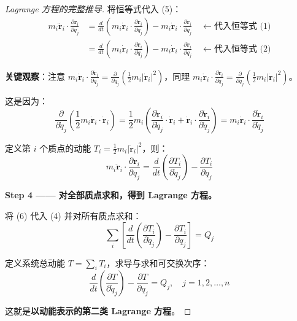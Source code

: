 \begin{proof}[Lagrange 方程的完整推导]
	将恒等式代入 (5)：
	\[
	\begin{aligned}
	m_i \ddot{\mathbf{r}}_i \cdot \frac{\partial \mathbf{r}_i}{\partial q_j} &= \frac{d}{dt} \left( m_i \dot{\mathbf{r}}_i \cdot \frac{\partial \dot{\mathbf{r}}_i}{\partial \dot{q}_j} \right) - m_i \dot{\mathbf{r}}_i \cdot \frac{\partial \dot{\mathbf{r}}_i}{\partial q_j} \quad \leftarrow \text{代入恒等式 (1)} \\
	&= \frac{d}{dt} \left( m_i \dot{\mathbf{r}}_i \cdot \frac{\partial \dot{\mathbf{r}}_i}{\partial \dot{q}_j} \right) - m_i \dot{\mathbf{r}}_i \cdot \frac{\partial \dot{\mathbf{r}}_i}{\partial q_j} \quad \leftarrow \text{代入恒等式 (2)}
	\end{aligned}
	\]
	
	\textbf{关键观察}：注意 $m_i \dot{\mathbf{r}}_i \cdot \frac{\partial \dot{\mathbf{r}}_i}{\partial \dot{q}_j} = \frac{\partial}{\partial \dot{q}_j} \left( \frac{1}{2} m_i |\dot{\mathbf{r}}_i|^2 \right)$，同理 $m_i \dot{\mathbf{r}}_i \cdot \frac{\partial \dot{\mathbf{r}}_i}{\partial q_j} = \frac{\partial}{\partial q_j} \left( \frac{1}{2} m_i |\dot{\mathbf{r}}_i|^2 \right)$。
	
	这是因为：
	\[
	\frac{\partial}{\partial \dot{q}_j} \left( \frac{1}{2} m_i \dot{\mathbf{r}}_i \cdot \dot{\mathbf{r}}_i \right) = \frac{1}{2} m_i \left( \frac{\partial \dot{\mathbf{r}}_i}{\partial \dot{q}_j} \cdot \dot{\mathbf{r}}_i + \dot{\mathbf{r}}_i \cdot \frac{\partial \dot{\mathbf{r}}_i}{\partial \dot{q}_j} \right) = m_i \dot{\mathbf{r}}_i \cdot \frac{\partial \dot{\mathbf{r}}_i}{\partial \dot{q}_j}
	\]
	
	定义第 $i$ 个质点的动能 $T_i = \frac{1}{2} m_i |\dot{\mathbf{r}}_i|^2$，则：
	\[
	m_i \ddot{\mathbf{r}}_i \cdot \frac{\partial \mathbf{r}_i}{\partial q_j} = \frac{d}{dt} \left( \frac{\partial T_i}{\partial \dot{q}_j} \right) - \frac{\partial T_i}{\partial q_j}
	\tag{6}
	\]
	
	\textbf{Step 4 —— 对全部质点求和，得到 Lagrange 方程。}
	
	将 (6) 代入 (4) 并对所有质点求和：
	\[
	\sum_i \left[ \frac{d}{dt} \left( \frac{\partial T_i}{\partial \dot{q}_j} \right) - \frac{\partial T_i}{\partial q_j} \right] = Q_j
	\]
	
	定义系统总动能 $T = \sum_i T_i$，求导与求和可交换次序：
	\[
	\frac{d}{dt} \left( \frac{\partial T}{\partial \dot{q}_j} \right) - \frac{\partial T}{\partial q_j} = Q_j, \quad j = 1, 2, \ldots, n
	\tag{7}
	\]
	
	这就是\textbf{以动能表示的第二类 Lagrange 方程}。
	

\end{proof}
